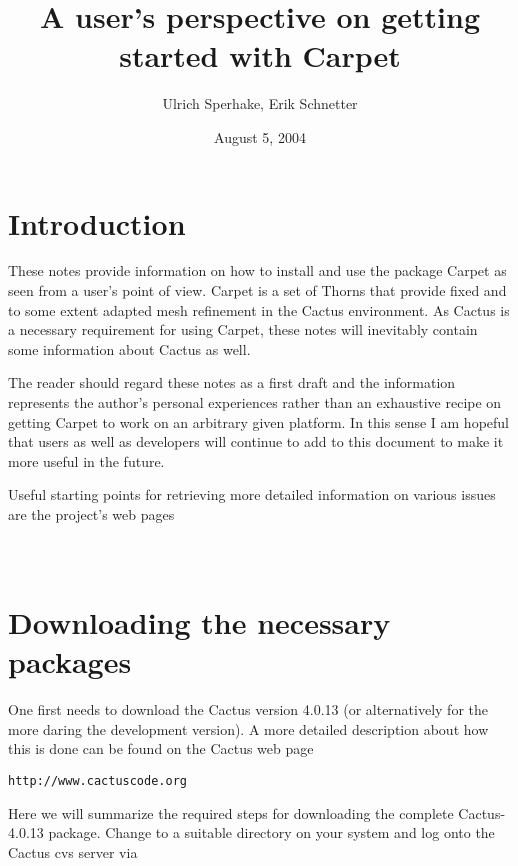 \documentclass[11pt]{article}
\numberwithin{equation}{section}
\begin{document}
\title{A user's perspective on getting started with Carpet}
\author{Ulrich Sperhake, Erik Schnetter}
\date{August 5, 2004}
\maketitle



\section{Introduction}

These notes provide information on how to install and use the package
Carpet as seen from a user's point of view. Carpet is a set of Thorns
that provide fixed and to some extent adapted mesh refinement in
the Cactus environment. As Cactus is a necessary requirement for
using Carpet, these notes will inevitably contain some information about
Cactus as well.

The reader should regard these notes as a first draft and the information
represents the author's personal experiences rather than an exhaustive
recipe on getting Carpet to work on an arbitrary given platform. In this sense I
am hopeful that users as well as developers will continue to add to this
document to make it more useful in the future.

Useful starting points for retrieving more detailed information on
various issues are the project's web pages\\

\hspace{1cm}{\tt http://www.cactuscode.org}\\

\hspace{1cm}{\tt http://www.carpetcode.org}\\


\section{Downloading the necessary packages}

One first needs to download the Cactus version 4.0.13 (or
alternatively for the more daring the development version).
A more detailed description about how this is done can be found on the
Cactus web page
%
\begin{center}
  {\tt http://www.cactuscode.org}
\end{center}
%
Here we will summarize the required steps for downloading the complete
Cactus-4.0.13 package. Change to a suitable directory on your system
and log onto the Cactus cvs server via\\
\end{document}
